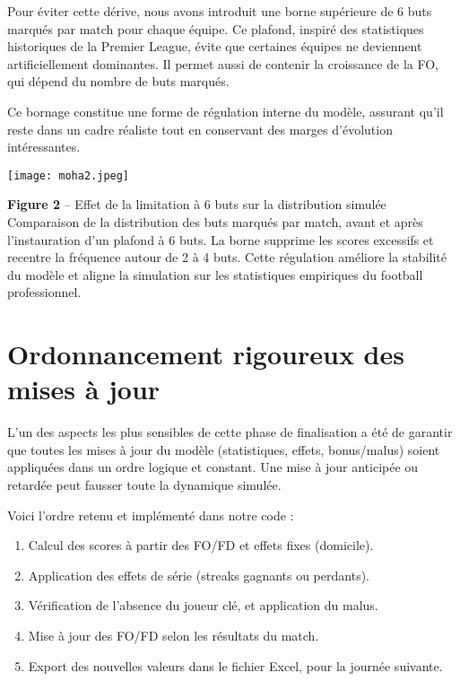 \documentclass[12pt]{report}
\begin{document}
Pour éviter cette dérive, nous avons introduit une borne supérieure de 6 buts marqués par match pour chaque équipe. Ce plafond, inspiré des statistiques historiques de la Premier League, évite que certaines équipes ne deviennent artificiellement dominantes. Il permet aussi de contenir la croissance de la FO, qui dépend du nombre de buts marqués.

Ce bornage constitue une forme de régulation interne du modèle, assurant qu’il reste dans un cadre réaliste tout en conservant des marges d’évolution intéressantes.
\begin{tcolorbox}[
  colback=white, colframe=green!60!black,
  title=\textcolor{white}{\textbf{Distribution des résultats simulés}},
  coltitle=white, colbacktitle=green!60!black,
  boxrule=0.8pt,
  left=4pt, right=4pt, top=5pt, bottom=5pt,
  boxsep=5pt,
  enhanced, sharp corners
]
\centering
\texttt{[image: moha2.jpeg]}
\label{fig:photo_label}
\end{tcolorbox}

\textbf{Figure 2} – Effet de la limitation à 6 buts sur la distribution simulée
Comparaison de la distribution des buts marqués par match, avant et après l’instauration d’un plafond à 6 buts. La borne supprime les scores excessifs et recentre la fréquence autour de 2 à 4 buts. Cette régulation améliore la stabilité du modèle et aligne la simulation sur les statistiques empiriques du football professionnel.

\section{Ordonnancement rigoureux des mises à jour}

L’un des aspects les plus sensibles de cette phase de finalisation a été de garantir que toutes les mises à jour du modèle (statistiques, effets, bonus/malus) soient appliquées dans un ordre logique et constant. Une mise à jour anticipée ou retardée peut fausser toute la dynamique simulée.

Voici l’ordre retenu et implémenté dans notre code :

\begin{enumerate}
  \item Calcul des scores à partir des FO/FD et effets fixes (domicile).
  \item Application des effets de série (streaks gagnants ou perdants).
  \item Vérification de l’absence du joueur clé, et application du malus.
  \item Mise à jour des FO/FD selon les résultats du match.
  \item Export des nouvelles valeurs dans le fichier Excel, pour la journée suivante.
\end{enumerate}
\end{document}
